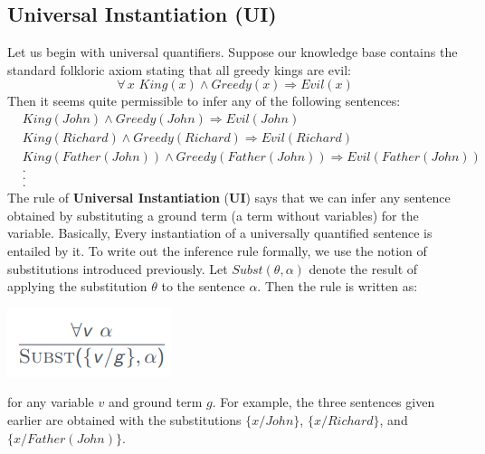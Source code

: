 \subsection{Universal Instantiation (UI)}
Let us begin with universal quantifiers. Suppose our knowledge base contains the standard folkloric axiom stating that all greedy kings are evil:
\[\forall \,x \,\, King(x) \land Greedy(x) \Rightarrow Evil(x)\]
Then it seems quite permissible to infer any of the following sentences:
\[
\begin{split}
    & King(John) \land Greedy(John) \Rightarrow Evil(John)\\
    & King(Richard) \land Greedy(Richard) \Rightarrow Evil(Richard)\\
    & King(Father (John)) \land Greedy(Father (John)) \Rightarrow Evil(Father (John))\\
    & .\\
    & .\\
    & .
\end{split}
\]
The rule of \textbf{Universal Instantiation} (\textbf{UI}) says that we can infer any sentence obtained by substituting a ground term (a term without variables) for the variable. Basically, Every instantiation of a universally quantified sentence is entailed by it. To write out the inference rule formally, we use the notion of substitutions introduced previously. Let $Subst(\theta,\alpha)$ denote the result of applying the substitution $\theta$ to the sentence $\alpha$. Then the rule is written as:
\begin{center}
    \includegraphics[scale=0.7]{images/UI.png}
\end{center}
for any variable $v$ and ground term $g$. For example, the three sentences given earlier are obtained with the substitutions $\{x/John\}$, $\{x/Richard\}$, and $\{x/Father (John)\}$.

